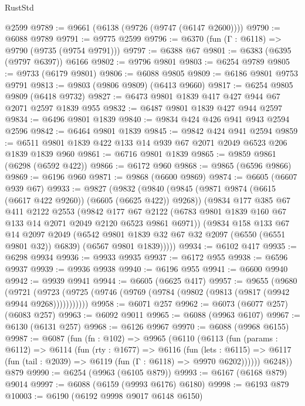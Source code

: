 \begin{lexlean}{RustStd}
\begin{coremodule}
    @2599
@9789 := @9661 (@6138 (@9726 (@9747 (@6147 @2600))))
@9790 := @6088 @9789
@9791 := @9775 @2599
@9796 := @6370 (fun (Γ : @6118) => @9790 (@9735 (@9754 @9791)))
@9797 := @6388 @67
@9801 := @6383 (@6395 (@9797 @6397)) @6166
@9802 := @9796 @9801
@9803 := @6254 @9789
@9805 := @9733 (@6179 @9801)
@9806 := @6088 @9805
@9809 := @6186 @9801 @9753 @9791
@9813 := @9803 (@9806 @9809) (@6413 @9660)
@9817 := @6254 @9805 @9809 (@6418 @9732)
@9827 := @6473 @9801 @1839 @417 @427 @944 @67 @2071 @2597 @1839 @955
@9832 := @6487 @9801 @1839 @427 @944 @2597
@9834 := @6496 @9801 @1839
@9840 := @9834 @424 @426 @941 @943 @2594 @2596
@9842 := @6464 @9801 @1839
@9845 := @9842 @424 @941 @2594
@9859 := @6511 @9801 @1839 @422 @133 @14 @939 @67 @2071 @2049 @6523 @206 @1839 @1839 @960
@9861 := @6716 @9801 @1839
@9865 := @9859 @9861 (@6298 (@6592 @422))
@9866 := @6172 @960
@9868 := @9865 (@6596 @9866)
@9869 := @6196 @960
@9871 := @9868 (@6600 @9869)
@9874 := @6605 (@6607 @939 @67)
@9933 := @9827
    (@9832
      (@9840
        (@9845 (@9871 @9874 (@6615 (@6617 @422 @9260)) (@6605 (@6625 @422)) @9268))
        (@9834
          @177
          @385
          @67
          @411
          @2122
          @2553
          (@9842
            @177
            @67
            @2122
            (@6783 @9801 @1839 @160 @67 @133 @14 @2071 @2049 @2120 @6523 @9861 @6971))
          (@9834
            @158
            @133
            @67
            @14
            @2097
            @2049
            (@6542 @9801 @1839 @32 @67 @32 @2097 (@6550 (@6551 @9801 @32)) @6839)
            (@6567 @9801 @1839)))))
@9934 := @6102 @417
@9935 := @6298 @9934
@9936 := @9933 @9935
@9937 := @6172 @955
@9938 := @6596 @9937
@9939 := @9936 @9938
@9940 := @6196 @955
@9941 := @6600 @9940
@9942 := @9939 @9941
@9944 := @6605 (@6625 @417)
@9957 := @9655
    (@9680
      (@9721 (@9723 (@9725 (@9746 (@9769 (@9784 (@9802 (@9813 (@9817 (@9942 @9944 @9268)))))))))))
@9958 := @6071 @257
@9962 := @6073 (@6077 @257) (@6083 @257)
@9963 := @6092 @9011
@9965 := @6088 (@9963 @6107)
@9967 := @6130 (@6131 @257)
@9968 := @6126 @9967
@9970 := @6088 (@9968 @6155)
@9987 := @6087
    (fun (fn : @102) =>
    @9965
      (@6110
        (@6113
          (fun (params : @6112) =>
          @6114
            (fun (rty : @1677) =>
            @6116
              (fun (lets : @6115) =>
              @6117 (fun (tail : @2039) => @6119 (fun (Γ : @6118) => @9970 @6202))))))
        @6248))
    @879
@9990 := @6254 (@9963 (@6105 @879))
@9993 := @6167 (@6168 @879) @9014
@9997 := @6088 (@6159 (@9993 @6176) @6180)
@9998 := @6193 @879
@10003 := @6190 (@6192 @9998 @9017 @6148 @6150)

\end{coremodule}
\end{lexlean}
